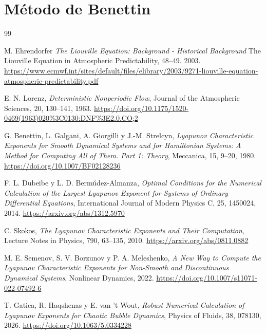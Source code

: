 \documentclass[12pt,a4paper,oneside]{report}
\numberwithin{equation}{chapter}
\begin{document}
\chapter{Método de Benettin}


\begin{thebibliography}{99}

 M. Ehrendorfer
\emph{The Liouville Equation: Background - Historical Background}
The Liouville Equation in Atmospheric Predictability, 48–49. 2003.
\url{https://www.ecmwf.int/sites/default/files/elibrary/2003/9271-liouville-equation-atmospheric-predictability.pdf}

 E. N. Lorenz, \emph{Deterministic Nonperiodic Flow}, Journal of the Atmospheric Sciences, 20, 130--141, 1963. \url{https://doi.org/10.1175/1520-0469(1963)020%3C0130:DNF%3E2.0.CO;2}

 G. Benettin, L. Galgani, A. Giorgilli y J.-M. Strelcyn, \emph{Lyapunov Characteristic Exponents for Smooth Dynamical Systems and for Hamiltonian Systems: A Method for Computing All of Them. Part 1: Theory}, Meccanica, 15, 9--20, 1980. \url{https://doi.org/10.1007/BF02128236}

 F. L. Dubeibe y L. D. Bermúdez-Almanza, \emph{Optimal Conditions for the Numerical Calculation of the Largest Lyapunov Exponent for Systems of Ordinary Differential Equations}, International Journal of Modern Physics C, 25, 1450024, 2014. \url{https://arxiv.org/abs/1312.5970}

 C. Skokos, \emph{The Lyapunov Characteristic Exponents and Their Computation}, Lecture Notes in Physics, 790, 63--135, 2010. \url{https://arxiv.org/abs/0811.0882}

 M. E. Semenov, S. V. Borzunov y P. A. Meleshenko, \emph{A New Way to Compute the Lyapunov Characteristic Exponents for Non-Smooth and Discontinuous Dynamical Systems}, Nonlinear Dynamics, 2022. \url{https://doi.org/10.1007/s11071-022-07492-6}

 T. Gatica, R. Haqshenas y E. van 't Wout, \emph{Robust Numerical Calculation of Lyapunov Exponents for Chaotic Bubble Dynamics}, Physics of Fluids, 38, 078130, 2026. \url{https://doi.org/10.1063/5.0334228}


\end{thebibliography}
\end{document}
